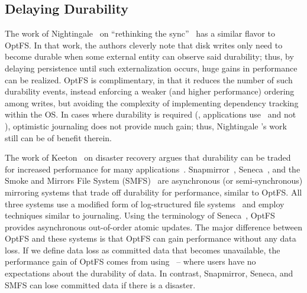 \subsection{Delaying Durability}
\label{sec-related-durability}

The work of Nightingale \etal\ on ``rethinking the
sync''~\cite{Nightingale06-Rethink} has a similar flavor to OptFS. In
that work, the authors cleverly note that disk writes only need to
become durable when some external entity can observe said durability;
thus, by delaying persistence until such externalization occurs, huge
gains in performance can be realized. OptFS is complimentary, in that
it reduces the number of such durability events, instead enforcing a
weaker (and higher performance) ordering among writes, but avoiding
the complexity of implementing dependency tracking within the OS. In
cases where durability is required (\ie, applications use \sysdsync\
and not \syscsync), optimistic journaling does not provide much gain;
thus, Nightingale \etal's work still can be of benefit therein.

The work of Keeton \etal\ on disaster recovery argues that durability
can be traded for increased performance for many
applications~\cite{KeetonEtAl02-Designing}.
Snapmirror~\cite{patterson2002snapmirror}, Seneca~\cite{ji2003seneca},
and the Smoke and Mirrors File System
(SMFS)~\cite{weatherspoon2009smoke} are asynchronous (or
semi-synchronous) mirroring systems that trade off durability for
performance, similar to OptFS. All three systems use a modified form
of log-structured file systems~\cite{RosenblumOusterhout92-LFS} and
employ techniques similar to journaling. Using the terminology of
Seneca~\cite{ji2003seneca}, OptFS provides asynchronous out-of-order
atomic updates. The major difference between OptFS and these systems
is that OptFS can gain performance without any data loss. If we define
data loss as committed data that becomes unavailable, the performance
gain of OptFS comes from using \syscsync\ -- where users have no
expectations about the durability of data. In contrast, Snapmirror,
Seneca, and SMFS can lose committed data if there is a disaster.

